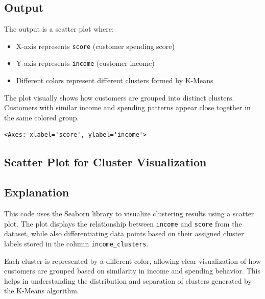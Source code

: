 \documentclass[11pt]{article}
\makeatletter
\newcommand{\boxspacing}{\kern\kvtcb@left@rule\kern\kvtcb@boxsep}
\newcommand{\prompt}[4]{
        {\ttfamily\llap{{\color{#2}[#3]:\hspace{3pt}#4}}\vspace{-\baselineskip}}
    }
\makeatother
\begin{document}
\subsection*{Output}
The output is a scatter plot where:
\begin{itemize}
    \item X-axis represents \texttt{score} (customer spending score)
    \item Y-axis represents \texttt{income} (customer income)
    \item Different colors represent different clusters formed by K-Means
\end{itemize}

The plot visually shows how customers are grouped into distinct clusters. Customers with similar income and spending patterns appear close together in the same colored group.
            \begin{tcolorbox}[breakable, size=fbox, boxrule=.5pt, pad at break*=1mm, opacityfill=0]
\prompt{Out}{outcolor}{18}{\boxspacing}
\begin{Verbatim}[commandchars=\\\{\}]
<Axes: xlabel='score', ylabel='income'>
\end{Verbatim}
\end{tcolorbox}
        
    \begin{center}
    \end{center}
    

\subsection{Scatter Plot for Cluster Visualization}

\subsection*{Explanation}
This code uses the Seaborn library to visualize clustering results using a scatter plot. The plot displays the relationship between \texttt{income} and \texttt{score} from the dataset, while also differentiating data points based on their assigned cluster labels stored in the column \texttt{income\_clusters}.

Each cluster is represented by a different color, allowing clear visualization of how customers are grouped based on similarity in income and spending behavior. This helps in understanding the distribution and separation of clusters generated by the K-Means algorithm.
\end{document}
